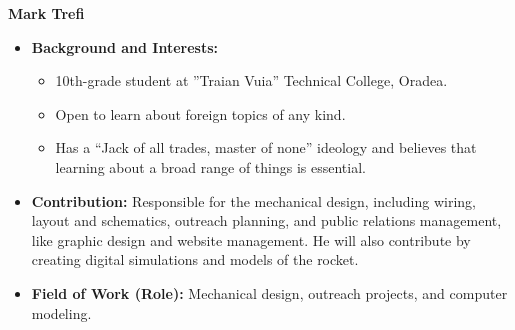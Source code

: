 \item[] \textbf{Mark Trefi}
    \begin{itemize}[label=]
        \item[\faGraduationCap] \textbf{Background and Interests:} 
        \begin{itemize}[label=\textbullet]
            \item 10th-grade student at ”Traian Vuia” Technical College, Oradea.
            \item Open to learn about foreign topics of any kind.
            \item Has a “Jack of all trades, master of none” ideology and believes that learning about a broad range of things is essential.
        \end{itemize}
        \item[\faEdit] \textbf{Contribution:} Responsible for the mechanical design, including wiring, layout and schematics, outreach planning, and public relations management, like graphic design and website management. He will also contribute by creating digital simulations and models of the rocket.
        \item[\faMicroscope] \textbf{Field of Work (Role):} Mechanical design, outreach projects, and computer modeling.
    \end{itemize}
